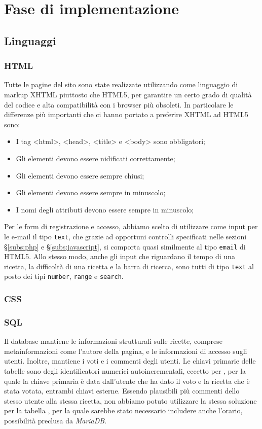 \section{Fase di implementazione}
\label{sec:fase_di_implementazione}
\subsection{Linguaggi}
\subsubsection{HTML}
Tutte le pagine del sito sono state realizzate utilizzando come linguaggio di markup XHTML piuttosto che HTML5, per garantire un certo grado di qualità del codice e alta compatibilità con i browser più obsoleti. In particolare le differenze più importanti che ci hanno portato a preferire XHTML ad HTML5 sono:
\begin{itemize}
	\item I tag <html>, <head>, <title> e <body> sono obbligatori;
	\item Gli elementi devono essere nidificati correttamente;
	\item Gli elementi devono essere sempre chiusi;
	\item Gli elementi devono essere sempre in minuscolo;
	\item I nomi degli attributi devono essere sempre in minuscolo;
\end{itemize}
Per le form di registrazione e accesso, abbiamo scelto di utilizzare come input per le e-mail il tipo \texttt{text}, che grazie ad opportuni controlli specificati nelle sezioni \S\ref{subs:php} e \S\ref{subs:javascript}, si comporta quasi similmente al tipo \texttt{email} di HTML5. Allo stesso modo, anche gli input che riguardano il tempo di una ricetta, la difficoltà di una ricetta e la barra di ricerca, sono tutti di tipo \texttt{text} al posto dei tipi \texttt{number}, \texttt{range} e \texttt{search}.

\subsubsection{CSS}

\subsubsection{SQL}
Il database mantiene le informazioni strutturali sulle ricette, comprese metainformazioni come l'autore della pagina, e le informazioni di accesso sugli utenti.
Inoltre, mantiene i voti e i commenti degli utenti.
Le chiavi primarie delle tabelle sono degli identificatori numerici autoincrementali, eccetto per , per la quale la chiave primaria è data dall'utente che ha dato il voto e la ricetta che è stata votata, entrambi chiavi esterne.
Essendo plausibili più commenti dello stesso utente alla stessa ricetta, non abbiamo potuto utilizzare la stessa soluzione per la tabella , per la quale sarebbe stato necessario includere anche l'orario, possibilità preclusa da \textit{MariaDB}.

